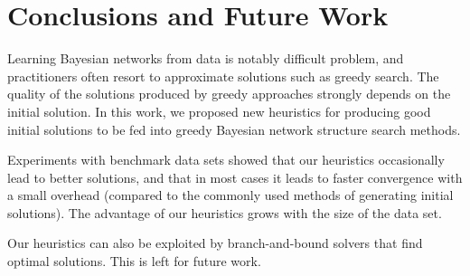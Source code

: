 \section{Conclusions and Future Work}
\label{sec:conclusions}

Learning Bayesian networks from data is notably difficult problem, and practitioners often resort to approximate solutions such as greedy search. The quality of the solutions produced by greedy approaches strongly depends on the initial solution. In this work, we proposed new heuristics for producing good initial solutions to be fed into greedy Bayesian network structure search methods.

Experiments with benchmark data sets showed that our heuristics
occasionally lead to better solutions, and that in most cases it leads
to faster convergence with a small overhead (compared to the commonly
used methods of generating initial solutions). The advantage of our
heuristics grows with the size of the data set.

Our heuristics can also be exploited by branch-and-bound solvers that
find optimal solutions. This is left for future work.


